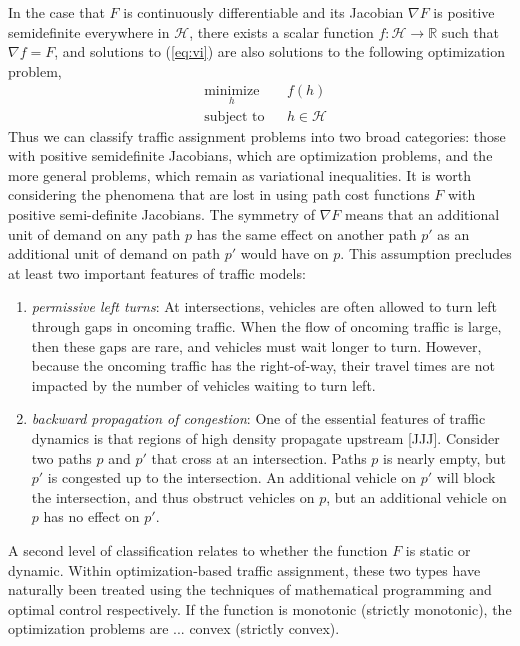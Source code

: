 In the case that $F$ is continuously differentiable and its Jacobian $\nabla F$ is positive semidefinite everywhere in $\mathcal{H}$, there exists a scalar function $f:\mathcal{H}\rightarrow \mathbb{R}$ such that $\nabla f = F$, and solutions to (\ref{eq:vi}) are also solutions to the following optimization problem,
\begin{equation}
\label{eq:opt}
\begin{aligned}
& \underset{h}{\text{minimize}}
& & f(h) \\
& \text{subject to}
& & h \in \mathcal{H}
\end{aligned}
\end{equation}
Thus we can classify traffic assignment problems into two broad categories: those with positive semidefinite Jacobians, which are optimization problems, and the more general problems, which remain as variational inequalities. It is worth considering the phenomena that are lost in using path cost functions $F$ with positive semi-definite Jacobians. The symmetry of $\nabla F$ means that an additional unit of demand on any path $p$ has the same effect on another path $p'$ as an additional unit of demand on path $p'$ would have on $p$. This assumption precludes at least two important features of traffic models:
\begin{enumerate}
\item \textit{permissive left turns}: At intersections, vehicles are often allowed to turn left through gaps in oncoming traffic. When the flow of oncoming traffic is large, then these gaps are rare, and vehicles must wait longer to turn. However, because the oncoming traffic has the right-of-way, their travel times are not impacted by the number of vehicles waiting to turn left. 
\item \textit{backward propagation of congestion}: One of the essential features of traffic dynamics is that regions of high density propagate upstream [JJJ]. Consider two paths $p$ and $p'$ that cross at an intersection. Paths $p$ is nearly empty, but $p'$ is congested up to the intersection. An additional vehicle on $p'$ will block the intersection, and thus obstruct vehicles on $p$, but an additional vehicle on $p$ has no effect on $p'$.
\end{enumerate}
A second level of classification relates to whether the function $F$ is static or dynamic. Within optimization-based traffic assignment, these two types have naturally been treated using the techniques of mathematical programming and optimal control respectively. If the function \XXX is monotonic (strictly monotonic), the optimization problems are ... convex (strictly convex).
